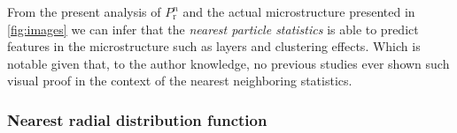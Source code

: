 From the present analysis of $P_\text{r}^n$ and the actual microstructure presented in \ref{fig:images} we can infer that the \textit{nearest particle statistics} is able to predict features in the microstructure such as layers and clustering effects. 
Which is notable given that, to the author knowledge, no previous studies ever shown such visual proof in the context of the nearest neighboring statistics. 


\subsubsection*{Nearest radial distribution function }

